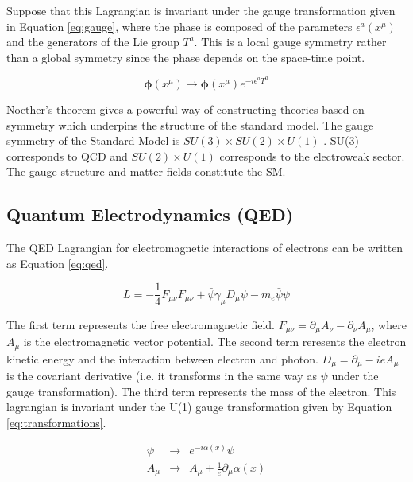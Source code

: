Suppose that this Lagrangian is invariant under the gauge transformation given
in Equation \ref{eq:gauge}, where the phase is composed of the parameters 
$\epsilon^{a}\left(x^{\mu}\right)$ and the generators of the Lie group $T^{a}$. 
This is a local gauge symmetry rather than a global symmetry since the phase 
depends on the space-time point. 

\begin{equation} 
\boldsymbol\phi(x^{\mu})\rightarrow \boldsymbol\phi(x^{\mu})e^{-i\epsilon^{a}T^{a}}
\label{eq:gauge}
\end{equation}

Noether's theorem gives a powerful way of constructing theories based on 
symmetry which underpins the structure of the standard model. The gauge
symmetry of the Standard Model is $SU(3)\times SU(2)\times U(1)$ \cite{rubakov,
aitchison_and_hey}. SU(3) corresponds to QCD and $SU(2)\times U(1)$ corresponds 
to the electroweak sector. The gauge structure and matter fields constitute the 
SM.

\subsection{Quantum Electrodynamics (QED)}

The QED Lagrangian for electromagnetic interactions of electrons can be written 
as Equation \ref{eq:qed}.

\begin{equation}
L = -\frac{1}{4}F_{\mu\nu}F_{\mu\nu} + \bar{\psi}\gamma_{\mu}D_{\mu}\psi
- m_{e}\bar{\psi}\psi
\label{eq:qed}
\end{equation} 

The first term represents the free electromagnetic field. $F_{\mu\nu} = 
\partial_{\mu}A_{\nu} - \partial_{\nu}A_{\mu}$, where $A_{\mu}$ is the 
electromagnetic vector potential. The second term reresents the electron kinetic 
energy and the interaction between electron and photon. $D_{\mu} = 
\partial_{\mu} - ieA_{\mu}$ is the covariant derivative (i.e. it transforms in 
the same way as $\psi$ under the gauge transformation). The third term 
represents the mass of the electron. This lagrangian is invariant under the U(1) 
gauge transformation given by Equation \ref{eq:transformations}.

\begin{eqnarray}
\psi &\rightarrow& e^{-i\alpha(x)}\psi \\
A_{\mu}   &\rightarrow& A_{\mu} + \frac{1}{e}\partial_{\mu}\alpha(x)
\label{eq:transformations}
\end{eqnarray}

